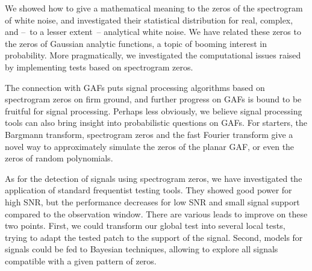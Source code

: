 We showed how to give a mathematical meaning to the zeros of the spectrogram of
white noise, and investigated their statistical distribution for real, complex,
and --~to a lesser extent~-- analytical white noise. We have related these zeros
to the zeros of Gaussian analytic functions, a topic of booming interest in
probability. More pragmatically, we investigated the computational issues raised
by implementing tests based on spectrogram zeros. 

The connection with GAFs puts signal processing algorithms based on
spectrogram zeros on firm ground, and further progress on GAFs is bound to be
fruitful for signal processing. Perhaps less obviously, we believe
signal processing tools can also bring insight into probabilistic questions on
GAFs. For starters, the Bargmann transform, spectrogram zeros and the fast Fourier transform give a novel way to approximately simulate the zeros of the planar GAF, or even the zeros of random polynomials.

As for the detection of signals using spectrogram
zeros, we have investigated the application of standard frequentist testing
tools. They showed good power for high SNR, but the performance decreases for
low SNR and small signal support compared to the observation window. 
There are various leads to improve on these two points. First, we could
transform our global test into several local tests, trying to adapt the tested
patch to the support of the signal. Second, models for signals could be fed to
Bayesian techniques, allowing to explore all signals compatible with a
given pattern of zeros.

